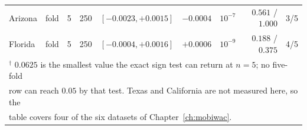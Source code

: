 \begin{table}[htbp]
{\begin{tabular}{llrrlrrrr}
        Arizona    & fold & 5 & 250 & $[-0.0023, +0.0015]$ & $-0.0004$ & $10^{-7}$ & $0.561$ / $1.000$ & 3/5 \\
        Florida    & fold & 5 & 250 & $[-0.0004, +0.0016]$ & $+0.0006$ & $10^{-9}$ & $0.188$ / $0.375$ & 4/5 \\
        \bottomrule
        \multicolumn{9}{l}{\footnotesize $^{\dagger}$ $0.0625$ is the smallest value the exact sign test can return at $n = 5$; no five-fold} \\
        \multicolumn{9}{l}{\footnotesize row can reach $0.05$ by that test. Texas and California are not measured here, so the} \\
        \multicolumn{9}{l}{\footnotesize table covers four of the six datasets of Chapter~\ref{ch:mobiwac}.} \\
    \end{tabular}
    }
\end{table}
